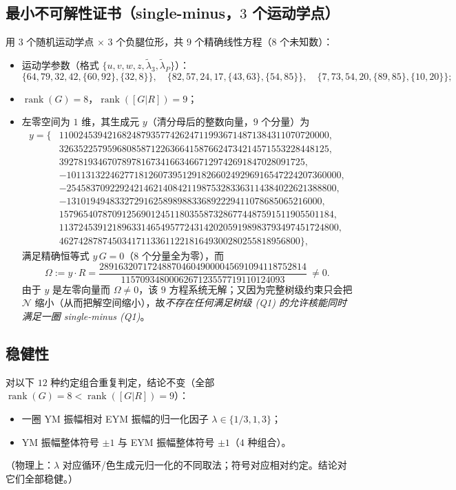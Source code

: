 \documentclass[11pt]{article}
\newcommand{\Pt}{P}
\begin{document}
\subsection{最小不可解性证书（single-minus，$3$ 个运动学点）}
用 $3$ 个随机运动学点 $\times$ $3$ 个负腿位形，共 $9$ 个精确线性方程（$8$ 个未知数）：
\begin{itemize}
\item 运动学参数（格式 $\{u,v,w,z,\widetilde\lambda_3,\widetilde\lambda_\Pt\}$）：
\[\{64,79,32,42,\{60,92\},\{32,8\}\},\quad
\{82,57,24,17,\{43,63\},\{54,85\}\},\quad
\{7,73,54,20,\{89,85\},\{10,20\}\};\]
\item $\operatorname{rank}(G)=8$，$\operatorname{rank}([G|R])=9$；
\item 左零空间为 $1$ 维，其生成元 $y$（清分母后的整数向量，$9$ 个分量）为
\[\begin{aligned}
y=\{&11002453942168248793577426247119936714871384311070720000,\\
&32635225795968085871226366415876624734214571553228448125,\\
&392781934670789781673416634667129742691847028091725,\\
&-101131322462771812607395129182660249296916547224207360000,\\
&-25458370922924214621408421198753283363114384022621388800,\\
&-13101949483327291625898988336892229411078685065216000,\\
&157965407870912569012451180355873286774487591511905501184,\\
&1137245391218963314654957724314202059198983793497451724800,\\
&46274287874503417113361122181649300280255818956800\},
\end{aligned}\]
满足精确恒等式 $y\,G=0$（$8$ 个分量全为零），而
\begin{equation}
\boxed{\ \Omega:=y\cdot R=\frac{2891632071724887046049000045691094118752814}{1157093480006267123557719110124093}\ \neq0.\ }
\label{eq:Omega}
\end{equation}
由于 $y$ 是左零向量而 $\Omega\neq0$，该 $9$ 方程系统无解；又因为完整树级约束只会把 $\mathcal N$ 缩小（从而把解空间缩小），故\emph{不存在任何满足树级 (Q1) 的允许核能同时满足一圈 single-minus (Q1)}。
\end{itemize}

\subsection{稳健性}
对以下 $12$ 种约定组合重复判定，结论不变（全部 $\operatorname{rank}(G)=8<\operatorname{rank}([G|R])=9$）：
\begin{itemize}
\item 一圈 YM 振幅相对 EYM 振幅的归一化因子 $\lambda\in\{1/3,1,3\}$；
\item YM 振幅整体符号 $\pm1$ 与 EYM 振幅整体符号 $\pm1$（$4$ 种组合）。
\end{itemize}
（物理上：$\lambda$ 对应循环/色生成元归一化的不同取法；符号对应相对约定。结论对它们全部稳健。）
\end{document}
